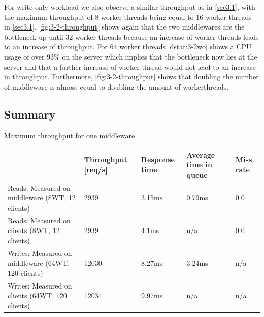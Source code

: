 \documentclass[11pt,a4paper]{article}
\begin{document}
For write-only workload we also observe a similar throughput as in \autoref{sec3.1}, with the maximum throughput of 8 worker threads being equal to 16 worker threads in \autoref{sec3.1}. \autoref{fig:3-2-throughput} shows again that the two middlewares are the bottleneck up until 32 worker threads because an increase of worker threads leads to an increase of throughput. For 64 worker threads \autoref{dstat:3-2wo} shows a CPU usage of over 93\% on the server which implies that the bottleneck now lies at the server and that a further increase of worker thread would not lead to an increase in throughput.
Furthermore, \autoref{fig:3-2-throughput} shows that doubling the number of middleware is almost equal to doubling the amount of workerthreads.


\subsection{Summary}



\begin{center}
	{Maximum throughput for one middleware.}
	\begin{tabular}{|l|p{2cm}|p{2cm}|p{2cm}|p{2cm}|}
		\hline                                                   & Throughput [req/s]    & Response time & Average time in queue & Miss rate \\ 
		\hline Reads: Measured on middleware (8WT, 12 clients)   &     2939       &    3.15ms     & 0.79ms                & 0.0       \\ 
		\hline Reads: Measured on clients (8WT, 12 clients)      &     2939       &    4.1ms      & n/a                   & 0.0       \\ 
		\hline Writes: Measured on middleware (64WT, 120 clients)&     12030      &    8.27ms     & 3.24ms                & n/a       \\ 
		\hline Writes: Measured on clients (64WT, 120 clients)   &     12034      &    9.97ms     & n/a                   & n/a       \\ 
		\hline 
	\end{tabular}
\end{center}
\end{document}
